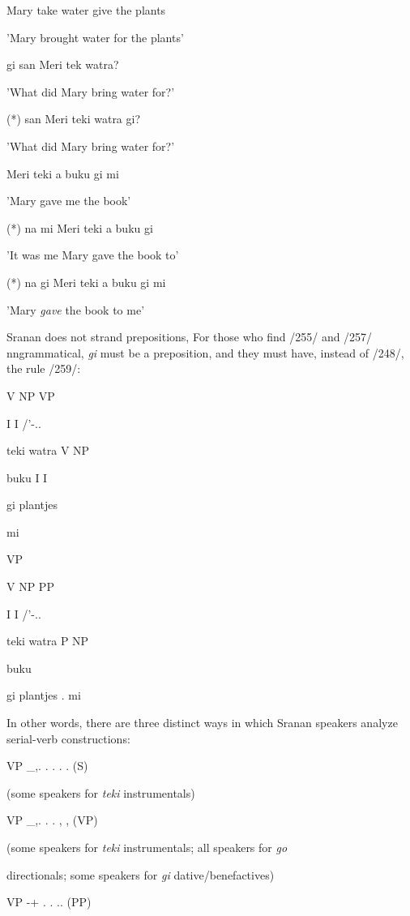 Mary take water give the plants

'Mary brought water for the plants'

\ea\label{ex:254}
 gi san Meri tek watra?
\glt
\z

'What did Mary bring water for?'

\ea\label{ex:255}
 (*) san Meri teki watra gi?
\glt
\z

'What did Mary bring water for?'

\ea\label{ex:256}
 Meri teki a buku gi mi
\glt
\z

'Mary gave me the book'

\ea\label{ex:257}
 (*) na mi Meri teki a buku gi
\glt
\z

'It was me Mary gave the book to'

\ea\label{ex:258}
 (*) na gi Meri teki a buku gi mi
\glt
\z

'Mary \textit{gave} the book to me'

Sranan does not strand prepositions, For those who find /255/ and /257/ nngrammatical, \textit{gi }must be a preposition, and they must have, instead of /248/, the rule /259/:


\ea\label{ex:261}

\glt
\z

V NP VP

I I /'-..

teki watra V NP

buku I I

gi plantjes

mi

VP

V NP PP

I I /'-..

teki watra P NP 

buku

gi plantjes . mi


In other words, there are three distinct ways in which Sranan speakers analyze serial-verb constructions:

\ea\label{ex:262}
 VP \_,. . . . . (S)
\glt
\z

(some speakers for \textit{teki} instrumentals)

VP \_,. . . , , (VP)

(some speakers for \textit{teki }instrumentals; all speakers for \textit{go}

directionals; some speakers for \textit{gi} dative/benefactives)

VP {}-+ . . .. (PP)

